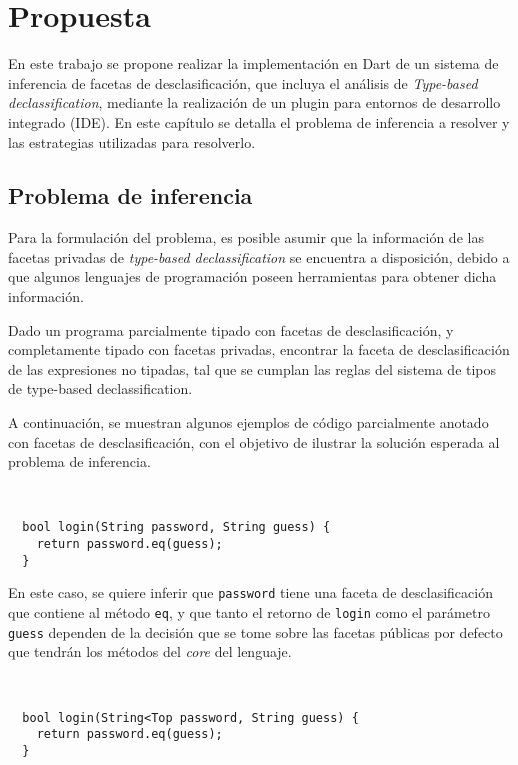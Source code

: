 \chapter{Propuesta}

En este trabajo se propone realizar la implementación en Dart de un sistema de inferencia de facetas de desclasificación, que incluya el análisis de \textit{Type-based declassification}, mediante la realización de un plugin para entornos de desarrollo integrado (IDE). En este capítulo se detalla el problema de inferencia a resolver y las estrategias utilizadas para resolverlo.

\section{Problema de inferencia}
Para la formulación del problema, es posible asumir que la información de las facetas privadas de \textit{type-based declassification} se encuentra a disposición, debido a que algunos lenguajes de programación poseen herramientas para obtener dicha información.

\begin{defn}
  Dado un programa parcialmente tipado con facetas de desclasificación, y completamente tipado con facetas privadas, encontrar la faceta de desclasificación de las expresiones no tipadas, tal que se cumplan las reglas del sistema de tipos de type-based declassification.
\end{defn}

A continuación, se muestran algunos ejemplos de código parcialmente anotado con facetas de desclasificación, con el objetivo de ilustrar la solución esperada al problema de inferencia.

\begin{ej} \ \\
  \label{ej1}
  \normalfont
\begin{lstlisting}
  bool login(String password, String guess) {
    return password.eq(guess);
  }
\end{lstlisting}
\end{ej}

En este caso, se quiere inferir que \texttt{password} tiene una faceta de desclasificación que contiene al método \texttt{eq}, y que tanto el retorno de \texttt{login} como el parámetro \texttt{guess} dependen de la decisión que se tome sobre las facetas públicas por defecto que tendrán los métodos del \textit{core} del lenguaje.

\begin{ej} \ \\
  \normalfont
\begin{lstlisting}
  bool login(String<Top password, String guess) {
    return password.eq(guess);
  }
\end{lstlisting}
\end{ej}


